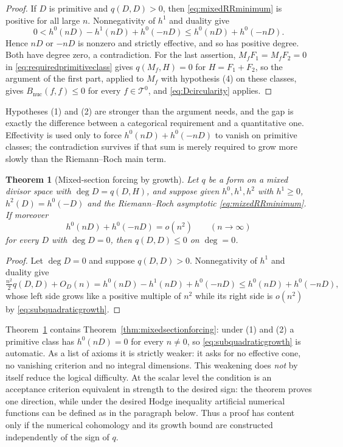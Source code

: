 \documentclass[11pt]{amsart}
\newtheorem{theorem}{Theorem}[section]
\theoremstyle{definition}
\theoremstyle{remark}
\begin{document}
\begin{proof}
If $D$ is primitive and $q(D,D)>0$, then
\eqref{eq:mixedRRminimum} is positive for all large $n$.  Nonnegativity of
$h^1$ and duality give
\[
 0<h^0(nD)-h^1(nD)+h^0(-nD)
 \le h^0(nD)+h^0(-nD).
\]
Hence $nD$ or $-nD$ is nonzero and strictly effective, and so has positive
degree.  Both have degree zero, a contradiction.  For the last assertion,
$M_fF_1=M_fF_2=0$ in \eqref{eq:requiredprimitiveclass} gives
$q(M_f,H)=0$ for $H=F_1+F_2$, so the argument of the first part, applied
to $M_f$ with hypothesis (4) on these classes, gives
$B_{\mathrm{nuc}}(f,f)\le0$ for every $f\in\mathcal T^0$, and
\eqref{eq:Dcircularity} applies.
\end{proof}

Hypotheses (1) and (2) are stronger than the argument needs, and the gap is
exactly the difference between a categorical requirement and a quantitative
one.  Effectivity is used only to force $h^0(nD)+h^0(-nD)$ to vanish on
primitive classes; the contradiction survives if that sum is merely required
to grow more slowly than the Riemann--Roch main term.

\begin{theorem}[Mixed-section forcing by growth]
\label{thm:growthforcing}
Let $q$ be a form on a mixed divisor space with $\deg D=q(D,H)$, and suppose
given $h^0,h^1,h^2$ with $h^1\ge0$, $h^2(D)=h^0(-D)$ and the Riemann--Roch
asymptotic \eqref{eq:mixedRRminimum}.  If moreover
\begin{equation}\label{eq:subquadraticgrowth}
 h^0(nD)+h^0(-nD)=o(n^2)\qquad(n\to\infty)
\end{equation}
for every $D$ with $\deg D=0$, then $q(D,D)\le0$ on $\deg=0$.
\end{theorem}

\begin{proof}
Let $\deg D=0$ and suppose $q(D,D)>0$.  Nonnegativity of $h^1$ and duality
give
\[
 \tfrac{n^2}{2}q(D,D)+O_D(n)
 =h^0(nD)-h^1(nD)+h^0(-nD)
 \le h^0(nD)+h^0(-nD),
\]
whose left side grows like a positive multiple of $n^2$ while its right side
is $o(n^2)$ by \eqref{eq:subquadraticgrowth}.
\end{proof}

Theorem~\ref{thm:growthforcing} contains
Theorem~\ref{thm:mixedsectionforcing}: under (1) and (2) a primitive class
has $h^0(nD)=0$ for every $n\ne0$, so \eqref{eq:subquadraticgrowth} is
automatic.  As a list of axioms it is strictly weaker: it asks for no
effective cone, no vanishing criterion and no integral dimensions.  This
weakening does \emph{not} by itself reduce the logical difficulty.  At the
scalar level the condition is an acceptance criterion equivalent in strength
to the desired sign: the theorem proves one direction, while under the
desired Hodge inequality artificial numerical functions can be defined as in
the paragraph below.  Thus a proof has content only if the numerical
cohomology and its growth bound are constructed independently of the sign of
$q$.
\end{document}
